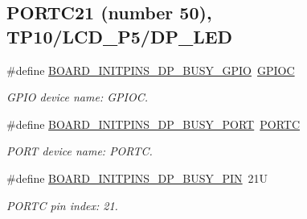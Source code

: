 \subsection*{P\+O\+R\+T\+C21 (number 50), T\+P10/\+L\+C\+D\+\_\+\+P5/\+D\+P\+\_\+\+L\+ED}
\begin{DoxyCompactItemize}
\item 
\mbox{\label{group__pin__mux_ga0066c09b54ae90826f69cfc102de8ba8}} 
\#define \mbox{\hyperlink{group__pin__mux_ga0066c09b54ae90826f69cfc102de8ba8}{B\+O\+A\+R\+D\+\_\+\+I\+N\+I\+T\+P\+I\+N\+S\+\_\+\+D\+P\+\_\+\+B\+U\+S\+Y\+\_\+\+G\+P\+IO}}~\mbox{\hyperlink{group___g_p_i_o___peripheral___access___layer_ga2dca03332d620196ba943bc2346eaa08}{G\+P\+I\+OC}}
\begin{DoxyCompactList}\small\item\em G\+P\+IO device name\+: G\+P\+I\+OC. \end{DoxyCompactList}\item 
\mbox{\label{group__pin__mux_ga6c20f9b79219d53ab95f3f8dad82de3b}} 
\#define \mbox{\hyperlink{group__pin__mux_ga6c20f9b79219d53ab95f3f8dad82de3b}{B\+O\+A\+R\+D\+\_\+\+I\+N\+I\+T\+P\+I\+N\+S\+\_\+\+D\+P\+\_\+\+B\+U\+S\+Y\+\_\+\+P\+O\+RT}}~\mbox{\hyperlink{group___p_o_r_t___peripheral___access___layer_ga68fea88642279a70246e026e7221b0a5}{P\+O\+R\+TC}}
\begin{DoxyCompactList}\small\item\em P\+O\+RT device name\+: P\+O\+R\+TC. \end{DoxyCompactList}\item 
\mbox{\label{group__pin__mux_ga10aec3e8e433b9f41e005bddd17ff7e4}} 
\#define \mbox{\hyperlink{group__pin__mux_ga10aec3e8e433b9f41e005bddd17ff7e4}{B\+O\+A\+R\+D\+\_\+\+I\+N\+I\+T\+P\+I\+N\+S\+\_\+\+D\+P\+\_\+\+B\+U\+S\+Y\+\_\+\+P\+IN}}~21U
\begin{DoxyCompactList}\small\item\em P\+O\+R\+TC pin index\+: 21. \end{DoxyCompactList}\end{DoxyCompactItemize}

